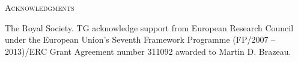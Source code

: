 \documentclass[12pt,letterpaper]{article}
\renewcommand{\section}[1]{%
\bigskip
\begin{center}
\begin{Large}
\normalfont\scshape #1
\medskip
\end{Large}
\end{center}}
\begin{document}












\section{Acknowledgments}
The Royal Society.
TG acknowledge support from European Research Council under the European Union's Seventh Framework Programme (FP/2007 – 2013)/ERC Grant Agreement number 311092 awarded to Martin D. Brazeau.




\end{document}
